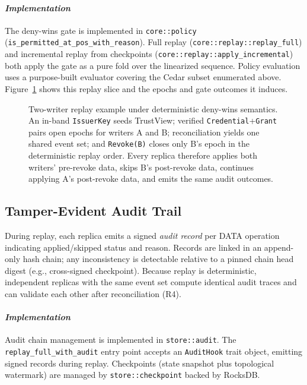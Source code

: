 \documentclass[10pt,journal,compsoc]{IEEEtran}
\begin{document}
\paragraph*{\textit{\textbf{Implementation}}} The deny-wins gate is implemented in \texttt{core::policy} (\texttt{is\_permitted\_at\_pos\_with\_reason}). Full replay (\texttt{core::replay::replay\_full}) and incremental replay from checkpoints (\texttt{core::replay::apply\_incremental}) both apply the gate as a pure fold over the linearized sequence. Policy evaluation uses a purpose-built evaluator covering the Cedar subset enumerated above. Figure~\ref{fig:deny-wins} shows this replay slice and the epochs and gate outcomes it induces.

\begin{figure}[!htbp]
\centering
\resizebox{\textwidth}{!}{}
\caption{Two-writer replay example under deterministic deny-wins semantics. An in-band \texttt{IssuerKey} seeds TrustView; verified \texttt{Credential}+\texttt{Grant} pairs open epochs for writers A and B; reconciliation yields one shared event set; and \texttt{Revoke(B)} closes only B's epoch in the deterministic replay order. Every replica therefore applies both writers' pre-revoke data, skips B's post-revoke data, continues applying A's post-revoke data, and emits the same audit outcomes.}
\label{fig:deny-wins}
\end{figure}


\subsection{Tamper-Evident Audit Trail}

During replay, each replica emits a signed \emph{audit record} per DATA operation indicating applied/skipped status and reason. Records are linked in an append-only hash chain; any inconsistency is detectable relative to a pinned chain head digest (e.g., cross-signed checkpoint). Because replay is deterministic, independent replicas with the same event set compute identical audit traces and can validate each other after reconciliation (R4).

\paragraph*{\textit{\textbf{Implementation}}} Audit chain management is implemented in \texttt{store::audit}. The \texttt{replay\_full\_with\_audit} entry point accepts an \texttt{AuditHook} trait object, emitting signed records during replay. Checkpoints (state snapshot plus topological watermark) are managed by \texttt{store::checkpoint} backed by RocksDB.
\end{document}
